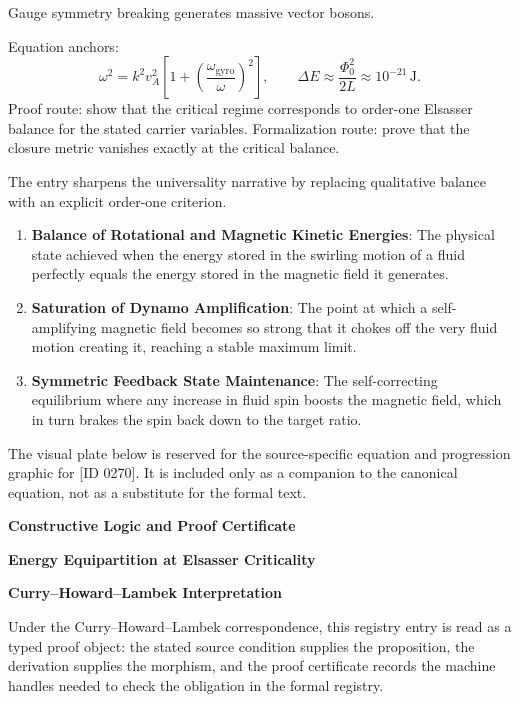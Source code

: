 Gauge symmetry breaking generates massive vector bosons.

Equation anchors:
\[
\omega^2=k^2v_A^2\left[1+\left(\frac{\omega_{\mathrm{gyro}}}{\omega}\right)^2\right],
\qquad
\Delta E\approx\frac{\Phi_0^2}{2L}\approx10^{-21}\,\mathrm{J}.
\]
Proof route: show that the critical regime corresponds to order-one Elsasser balance for the stated carrier variables. Formalization route: prove that the closure metric vanishes exactly at the critical balance.

The entry sharpens the universality narrative by replacing qualitative balance with an explicit order-one criterion.
\endgroup

\begin{enumerate}[leftmargin=1.6em,itemsep=6pt,topsep=4pt]
\item \textbf{Balance of Rotational and Magnetic Kinetic Energies}: The physical state achieved when the energy stored in the swirling motion of a fluid perfectly equals the energy stored in the magnetic field it generates.
\item \textbf{Saturation of Dynamo Amplification}: The point at which a self-amplifying magnetic field becomes so strong that it chokes off the very fluid motion creating it, reaching a stable maximum limit.
\item \textbf{Symmetric Feedback State Maintenance}: The self-correcting equilibrium where any increase in fluid spin boosts the magnetic field, which in turn brakes the spin back down to the target ratio.
\end{enumerate}

\begingroup\footnotesize\sloppy
The visual plate below is reserved for the source-specific equation and progression graphic for [ID 0270]. It is included only as a companion to the canonical equation, not as a substitute for the formal text.
\par\endgroup
\ifTZPDarkEdition
{}
\fi

\clearpage
\begingroup\tzpsupportsetup
\noindent\textbf{\fontsize{10.8pt}{12.8pt}\selectfont [ID 0270] Constructive Logic and Proof Certificate}\par
\noindent\textbf{\fontsize{10pt}{12pt}\selectfont Energy Equipartition at Elsasser Criticality}\par
\vspace{0.45em}
\begingroup
\footnotesize
\setlength{\parskip}{0.22em}
\setlength{\parindent}{0pt}
\noindent\textbf{Curry--Howard--Lambek Interpretation}\par
Under the Curry--Howard--Lambek correspondence, this registry entry is read as a typed proof
object: the stated source condition supplies the proposition, the derivation supplies the
morphism, and the proof certificate records the machine handles needed to check the obligation
in the formal registry.


